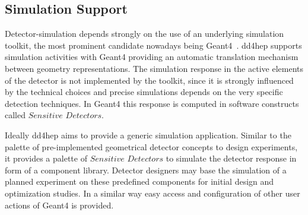 \subsection{Simulation Support}
\label{subsect:simulation-support}
\noindent
Detector-simulation depends strongly on the use of an underlying simulation toolkit, 
the most prominent candidate nowadays being Geant4~\cite{bib:geant4}.
dd4hep supports simulation activities with Geant4 providing
an automatic translation mechanism between geometry representations.
The simulation response in the active elements of the detector
is not implemented by the toolkit, since it is strongly influenced by the technical 
choices and precise simulations depends on the very specific detection techniques.
In Geant4 this response is computed in software constructs called $Sensitive$ 
$Detectors$.

\noindent
Ideally dd4hep aims to provide a generic simulation application.
Similar to the palette of pre-implemented geometrical detector 
concepts to design experiments, it provides a palette of $Sensitive$
$Detectors$ to simulate the detector response in form of a component library.
Detector designers may base the simulation of a planned experiment 
on these predefined components for initial design and optimization 
studies.  In a similar way easy access
and configuration of other user actions of Geant4 is provided.

